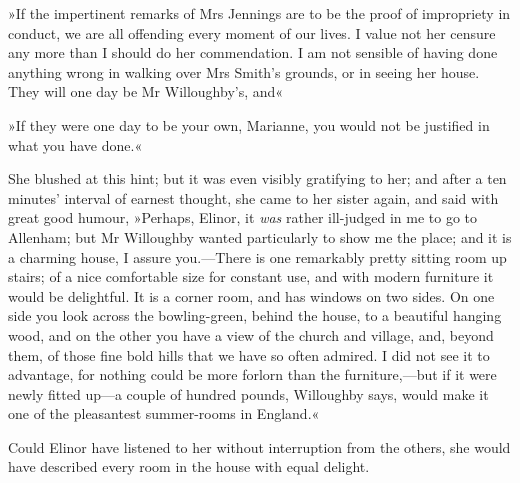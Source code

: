 »If the impertinent remarks of Mrs Jennings are to be the proof of impropriety in conduct, we are all offending every moment of our lives. I value not her censure any more than I should do her commendation. I am not sensible of having done anything wrong in walking over Mrs Smith’s grounds, or in seeing her house. They will one day be Mr Willoughby’s, and\longdash«

»If they were one day to be your own, Marianne, you would not be justified in what you have done.«

She blushed at this hint; but it was even visibly gratifying to her; and after a ten minutes’ interval of earnest thought, she came to her sister again, and said with great good humour, »Perhaps, Elinor, it \textit{was} rather ill-judged in me to go to Allenham; but Mr Willoughby wanted particularly to show me the place; and it is a charming house, I assure you.—There is one remarkably pretty sitting room up stairs; of a nice comfortable size for constant use, and with modern furniture it would be delightful. It is a corner room, and has windows on two sides. On one side you look across the bowling-green, behind the house, to a beautiful hanging wood, and on the other you have a view of the church and village, and, beyond them, of those fine bold hills that we have so often admired. I did not see it to advantage, for nothing could be more forlorn than the furniture,—but if it were newly fitted up—a couple of hundred pounds, Willoughby says, would make it one of the pleasantest summer-rooms in England.«

Could Elinor have listened to her without interruption from the others, she would have described every room in the house with equal delight.